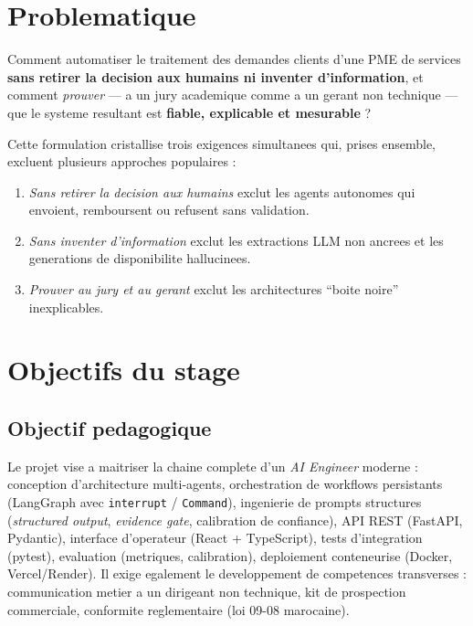 \documentclass[12pt,a4paper,openany]{report}
\begin{document}
\section{Problematique}

\begin{problembox}
Comment automatiser le traitement des demandes clients d'une PME de services \textbf{sans retirer la decision aux humains ni inventer d'information}, et comment \emph{prouver} --- a un jury academique comme a un gerant non technique --- que le systeme resultant est \textbf{fiable, explicable et mesurable} ?
\end{problembox}

Cette formulation cristallise trois exigences simultanees qui, prises ensemble, excluent plusieurs approches populaires :
\begin{enumerate}[leftmargin=1.5cm]
    \item \emph{Sans retirer la decision aux humains} exclut les agents autonomes qui envoient, remboursent ou refusent sans validation.
    \item \emph{Sans inventer d'information} exclut les extractions LLM non ancrees et les generations de disponibilite hallucinees.
    \item \emph{Prouver au jury et au gerant} exclut les architectures ``boite noire'' inexplicables.
\end{enumerate}

\section{Objectifs du stage}

\subsection{Objectif pedagogique}
Le projet vise a maitriser la chaine complete d'un \emph{AI Engineer} moderne : conception d'architecture multi-agents, orchestration de workflows persistants (LangGraph avec \texttt{interrupt} / \texttt{Command}), ingenierie de prompts structures (\emph{structured output}, \emph{evidence gate}, calibration de confiance), API REST (FastAPI, Pydantic), interface d'operateur (React + TypeScript), tests d'integration (pytest), evaluation (metriques, calibration), deploiement conteneurise (Docker, Vercel/Render). Il exige egalement le developpement de competences transverses : communication metier a un dirigeant non technique, kit de prospection commerciale, conformite reglementaire (loi 09-08 marocaine).
\end{document}
